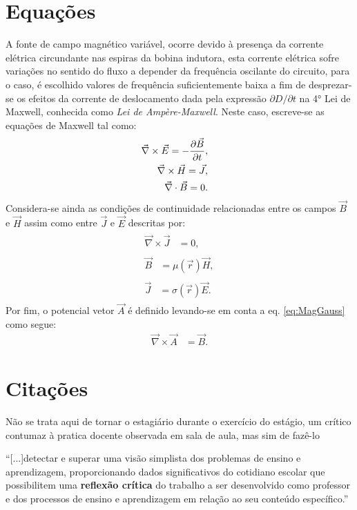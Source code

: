     \section{Equações}
    A fonte de campo magnético variável, ocorre devido à presença da corrente elétrica circundante nas espiras da bobina indutora, esta corrente elétrica sofre variações no sentido do fluxo a depender da frequência oscilante do circuito, para o caso, é escolhido valores de frequência suficientemente baixa a fim de desprezar-se os efeitos da corrente de deslocamento dada pela expressão $\partial D/\partial t$ na 4° Lei de Maxwell, conhecida como \emph{Lei de Ampère-Maxwell}. Neste caso, escreve-se as equações de Maxwell tal como:
\begin{align}	
	\begin{split}
		\label{eq:faraday}
		\vec{\nabla}\times\vec{E}&=-\frac{\partial {\vec{B}}}{\partial {t}},
	\end{split}
	\\
	\begin{split}
		\label{eq:ampere}		
		\vec{\nabla}\times\vec{H}&=\vec{J},
	\end{split}
	\\
	\begin{split}
		\label{eq:MagGauss}		
		\vec{\nabla}\cdot\vec{B}&=0.
	\end{split}
\end{align}
Considera-se ainda as condições de continuidade relacionadas entre os campos $\vec{B}$ e $\vec{H}$ assim como entre $\vec{J}$ e $\vec{E}$ descritas por:
\begin{align}
	\begin{split}
		\label{eq:contJ}
		\vec{\nabla}\times\vec{J}&=0,
	\end{split}
	\\
	\begin{split}
		\label{eq:conH}		
		\vec{B}&=\mu(\vec{r})\vec{H},
	\end{split}
	\\
	\begin{split}
		\label{eq:contE}		
		\vec{J}&=\sigma(\vec{r})\vec{E}.
	\end{split}
\end{align}
Por fim, o potencial vetor $\vec{A}$ é definido levando-se em conta a eq. \eqref{eq:MagGauss} como segue:
\begin{align}
	\label{eq:potVetor}
	\vec{\nabla}\times\vec{A}&=\vec{B}.
\end{align}
\section{Citações}
    Não se trata aqui de tornar o estagiário durante o exercício do estágio, um crítico contumaz à pratica docente observada em sala de aula, mas sim de fazê-lo 
\begin{citacao}
    ``[...]detectar e superar uma visão simplista dos problemas de ensino e aprendizagem, proporcionando dados significativos do cotidiano escolar que possibilitem uma \textbf{reflexão crítica} do trabalho a ser desenvolvido como professor e dos processos de ensino e aprendizagem em relação ao seu conteúdo específico.'' \cite[p. 11, \textbf{grifos meus}]{CARVALHOAMP:2012b} 
\end{citacao}
